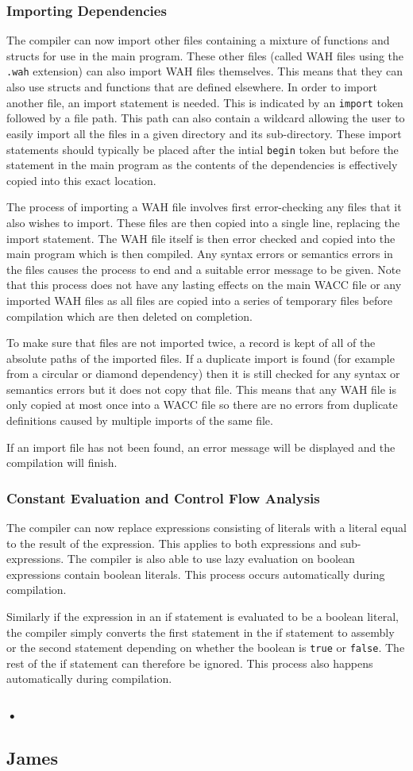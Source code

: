 \documentclass[]{article}
\begin{document}
\subsubsection{Importing Dependencies} { The compiler can now import other files containing a mixture of functions and structs for use in the main program. These other files (called WAH files using the {\tt .wah} extension) can also import WAH files themselves. This means that they can also use structs and functions that are defined elsewhere. In order to import another file, an import statement is needed. This is indicated by an {\tt import} token followed by a file path. This path can also contain a wildcard allowing the user to easily import all the files in a given directory and its sub-directory. These import statements should typically be placed after the intial {\tt begin} token but before the statement in the main program as the contents of the dependencies is effectively copied into this exact location.

The process of importing a WAH file involves first error-checking any files that it also wishes to import. These files are then copied into a single line, replacing the import statement. The WAH file itself is then error checked and copied into the main program which is then compiled. Any syntax errors or semantics errors in the files causes the process to end and a suitable error message to be given. Note that this process does not have any lasting effects on the main WACC file or any imported WAH files as all files are copied into a series of temporary files before compilation which are then deleted on completion.

To make sure that files are not imported twice, a record is kept of all of the absolute paths of the imported files. If a duplicate import is found (for example from a circular or diamond dependency) then it is still checked for any syntax or semantics errors but it does not copy that file. This means that any WAH file is only copied at most once into a WACC file so there are no errors from duplicate definitions caused by multiple imports of the same file.

If an import file has not been found, an error message will be displayed and the compilation will finish. }
\subsubsection{Constant Evaluation and Control Flow Analysis} { The compiler can now replace expressions consisting of literals with a literal equal to the result of the expression. This applies to both expressions and sub-expressions. The compiler is also able to use lazy evaluation on boolean expressions contain boolean literals. This process occurs automatically during compilation.

Similarly if the expression in an if statement is evaluated to be a boolean literal, the compiler simply converts the first statement in the if statement to assembly or the second statement depending on whether the boolean is {\tt true} or {\tt false}. The rest of the if statement can therefore be ignored. This process also happens automatically during compilation. }
\subsubsection{•}

\subsection{James}
\end{document}
